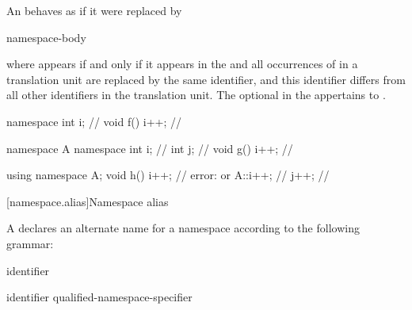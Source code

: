 \pnum
An  behaves as if it were
replaced by
\begin{ncsimplebnf}
   \terminal{\{}  \terminal{\}}\br
{}   \terminal{;}\br
{}  \terminal{\{} namespace-body \terminal{\}}
\end{ncsimplebnf}
where
 appears if and only if it appears in the
and all occurrences of  in a translation unit are replaced by
the same identifier, and this identifier differs from all other
identifiers in the translation unit.
The optional 
in the 
appertains to .
\begin{example}
\begin{codeblock}
namespace { int i; }            // 
void f() { i++; }               // 

namespace A {
  namespace {
    int i;                      // 
    int j;                      // 
  }
  void g() { i++; }             // 
}

using namespace A;
void h() {
  i++;                          // error:  or 
  A::i++;                       // 
  j++;                          // 
}
\end{codeblock}
\end{example}

[namespace.alias]{Namespace alias}%
%
%

\pnum
A  declares an alternate name for a
namespace according to the following grammar:
\begin{bnf}
\br
        identifier
\end{bnf}

\begin{bnf}
\br
         identifier \terminal{=} qualified-namespace-specifier \terminal{;}
\end{bnf}

